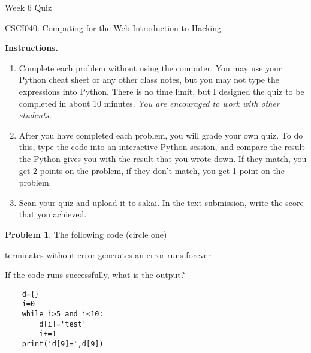 \documentclass[10pt]{article}
\theoremstyle{definition}
\newtheorem{problem}{Problem}
\begin{document}
\begin{center}
    {
\Large
Week 6 Quiz
}

    \vspace{0.1in}
    CSCI040: \sout{Computing for the Web} Introduction to Hacking

    \vspace{0.1in}
\end{center}

\vspace{0.15in}
%
%

\noindent\textbf{Instructions.}
\begin{enumerate}
\item
Complete each problem without using the computer.  
You may use your Python cheat sheet or any other class notes,
but you may not type the expressions into Python.
There is no time limit, but I designed the quiz to be completed in about 10 minutes.
\emph{You are encouraged to work with other students.}
\item
After you have completed each problem, you will grade your own quiz.
To do this, type the code into an interactive Python session,
and compare the result the Python gives you with the result that you wrote down.
If they match, you get 2 points on the problem,
if they don't match, you get 1 point on the problem.
\item
Scan your quiz and upload it to sakai.
In the text submission, write the score that you achieved.
\end{enumerate}
\vspace{0.15in}

\begin{problem}
    The following code (circle one)

    \vspace{0.25in}
    \hspace{0.5in}terminates without error 
    \hspace{1in}generates an error
    \hspace{1in}runs forever
    \vspace{0.25in}

    \noindent
    If the code runs successfully, what is the output?
\end{problem}
\begin{lstlisting}
    d={}
    i=0
    while i>5 and i<10:
        d[i]='test'
        i+=1
    print('d[9]=',d[9])
\end{lstlisting}
\vspace{1in}
\end{document}
